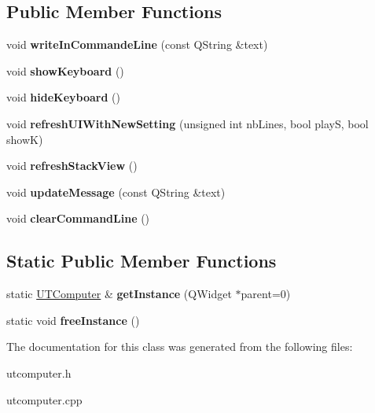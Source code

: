 \subsection*{Public Member Functions}
\begin{DoxyCompactItemize}
\item 
void {\bfseries write\+In\+Commande\+Line} (const Q\+String \&text)\hypertarget{class_u_t_computer_acc6e793d737e153c1541fec1b9cfe266}{}\label{class_u_t_computer_acc6e793d737e153c1541fec1b9cfe266}

\item 
void {\bfseries show\+Keyboard} ()\hypertarget{class_u_t_computer_af8b6bf3147eac7a4884065f3a3c2d9c7}{}\label{class_u_t_computer_af8b6bf3147eac7a4884065f3a3c2d9c7}

\item 
void {\bfseries hide\+Keyboard} ()\hypertarget{class_u_t_computer_aae6aaabb5fb225095051a0e767965358}{}\label{class_u_t_computer_aae6aaabb5fb225095051a0e767965358}

\item 
void {\bfseries refresh\+U\+I\+With\+New\+Setting} (unsigned int nb\+Lines, bool playS, bool showK)\hypertarget{class_u_t_computer_a1e5c49b52968351637bd30758b8b0d33}{}\label{class_u_t_computer_a1e5c49b52968351637bd30758b8b0d33}

\item 
void {\bfseries refresh\+Stack\+View} ()\hypertarget{class_u_t_computer_a9477d6f147ee9c04d5e07b0604aef4fe}{}\label{class_u_t_computer_a9477d6f147ee9c04d5e07b0604aef4fe}

\item 
void {\bfseries update\+Message} (const Q\+String \&text)\hypertarget{class_u_t_computer_a0244d88bf6b129436247563a586e2e68}{}\label{class_u_t_computer_a0244d88bf6b129436247563a586e2e68}

\item 
void {\bfseries clear\+Command\+Line} ()\hypertarget{class_u_t_computer_a1e4c13bbcb6a5295bc9dceda9b6533ba}{}\label{class_u_t_computer_a1e4c13bbcb6a5295bc9dceda9b6533ba}

\end{DoxyCompactItemize}
\subsection*{Static Public Member Functions}
\begin{DoxyCompactItemize}
\item 
static \hyperlink{class_u_t_computer}{U\+T\+Computer} \& {\bfseries get\+Instance} (Q\+Widget $\ast$parent=0)\hypertarget{class_u_t_computer_a6fcd37407e2cdc494ba9661d3ac54a5b}{}\label{class_u_t_computer_a6fcd37407e2cdc494ba9661d3ac54a5b}

\item 
static void {\bfseries free\+Instance} ()\hypertarget{class_u_t_computer_a15301ef36b3126962e647ea1ad9e4561}{}\label{class_u_t_computer_a15301ef36b3126962e647ea1ad9e4561}

\end{DoxyCompactItemize}


The documentation for this class was generated from the following files\+:\begin{DoxyCompactItemize}
\item 
utcomputer.\+h\item 
utcomputer.\+cpp\end{DoxyCompactItemize}
